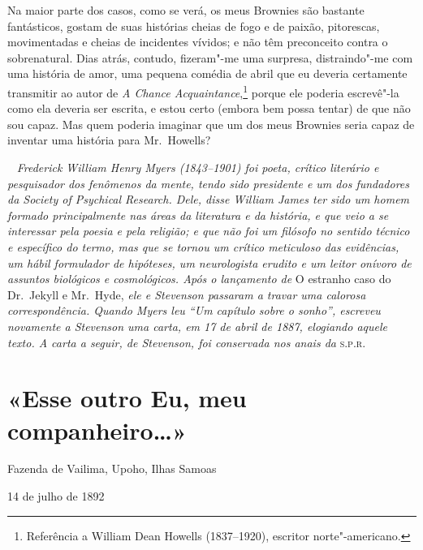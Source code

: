 Na maior parte dos casos, como se verá, os meus Brownies são bastante
fantásticos, gostam de suas histórias cheias de fogo e de paixão,
pitorescas, movimentadas e cheias de incidentes vívidos; e não têm
preconceito contra o sobrenatural.  Dias atrás, contudo, fizeram"-me uma
surpresa, distraindo"-me com uma história de amor, uma pequena comédia
de abril que eu deveria certamente transmitir ao autor de \textit{A
Chance Acquaintance},\footnote{ Referência a William Dean 
Howells (1837--1920), escritor norte"-americano.} porque ele poderia escrevê"-la como ela deveria
ser escrita, e estou certo (embora bem possa tentar) de que não sou
capaz.  Mas quem poderia imaginar que um dos meus Brownies seria capaz
de inventar uma história para Mr.~Howells?

\clearpage
\ifodd\thepage ~ \clearpage\else\relax\fi
\thispagestyle{empty}
\mbox{}\vfill
{\noindent\itshape Frederick William Henry Myers (1843--1901) foi poeta, crítico           \label{cartastev}
literário e pesquisador dos fenômenos da mente, tendo sido presidente e
um dos fundadores da Society of Psychical Research.  Dele, disse
William James ter sido um homem formado principalmente nas áreas da
literatura e da história, e que veio a se interessar pela poesia e pela
religião; e que não foi um filósofo no sentido técnico e específico do
termo, mas que se tornou um crítico meticuloso das evidências, um hábil
formulador de hipóteses, um neurologista erudito e um leitor onívoro de
assuntos biológicos e cosmológicos.  Após o lançamento de}
O estranho caso do Dr.~Jekyll e Mr.~Hyde, \textit{ele e Stevenson passaram a travar
uma calorosa correspondência.  Quando Myers leu ``Um capítulo
sobre o sonho'', escreveu novamente a Stevenson uma carta, em 17
de abril de 1887, elogiando aquele texto.  A carta a seguir, de
Stevenson, foi conservada nos anais da} \textsc{s.p.r.}

\chapter[Esse outro Eu, meu companheiro\ldots{}\\ \textit{R.L.~Stevenson}]{«Esse outro Eu, meu companheiro\ldots{}»}

\vspace*{.8em}

Fazenda de Vailima, Upoho, Ilhas Samoas

14 de julho de 1892 


